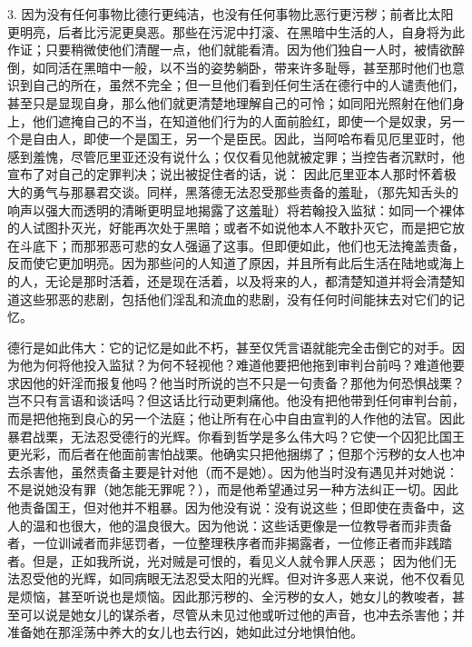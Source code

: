 3. 因为没有任何事物比德行更纯洁，也没有任何事物比恶行更污秽；前者比太阳更明亮，后者比污泥更臭恶。那些在污泥中打滚、在黑暗中生活的人，自身将为此作证；只要稍微使他们清醒一点，他们就能看清。因为他们独自一人时，被情欲醉倒，如同活在黑暗中一般，以不当的姿势躺卧，带来许多耻辱，甚至那时他们也意识到自己的所在，虽然不完全；但一旦他们看到任何生活在德行中的人谴责他们，甚至只是显现自身，那么他们就更清楚地理解自己的可怜；如同阳光照射在他们身上，他们遮掩自己的不当，在知道他们行为的人面前脸红，即使一个是奴隶，另一个是自由人，即使一个是国王，另一个是臣民。因此，当阿哈布看见厄里亚时，他感到羞愧，尽管厄里亚还没有说什么；仅仅看见他就被定罪；当控告者沉默时，他宣布了对自己的定罪判决；说出被捉住者的话，说： 因此厄里亚本人那时怀着极大的勇气与那暴君交谈。同样，黑落德无法忍受那些责备的羞耻，（那先知舌头的响声以强大而透明的清晰更明显地揭露了这羞耻）将若翰投入监狱：如同一个裸体的人试图扑灭光，好能再次处于黑暗；或者不如说他本人不敢扑灭它，而是把它放在斗底下；而那邪恶可悲的女人强逼了这事。但即便如此，他们也无法掩盖责备，反而使它更加明亮。因为那些问的人知道了原因，并且所有此后生活在陆地或海上的人，无论是那时活着，还是现在活着，以及将来的人，都清楚知道并将会清楚知道这些邪恶的悲剧，包括他们淫乱和流血的悲剧，没有任何时间能抹去对它们的记忆。\par

德行是如此伟大：它的记忆是如此不朽，甚至仅凭言语就能完全击倒它的对手。因为他为何将他投入监狱？为何不轻视他？难道他要把他拖到审判台前吗？难道他要求因他的奸淫而报复他吗？他当时所说的岂不只是一句责备？那他为何恐惧战栗？岂不只有言语和谈话吗？但这话比行动更刺痛他。他没有把他带到任何审判台前，而是把他拖到良心的另一个法庭；他让所有在心中自由宣判的人作他的法官。因此暴君战栗，无法忍受德行的光辉。你看到哲学是多么伟大吗？它使一个囚犯比国王更光彩，而后者在他面前害怕战栗。他确实只把他捆绑了；但那个污秽的女人也冲去杀害他，虽然责备主要是针对他（而不是她）。因为他当时没有遇见并对她说：不是说她没有罪（她怎能无罪呢？），而是他希望通过另一种方法纠正一切。因此他责备国王，但对他并不粗暴。因为他没有说：没有说这些；但即使在责备中，这人的温和也很大，他的温良很大。因为他说：这些话更像是一位教导者而非责备者，一位训诫者而非惩罚者，一位整理秩序者而非揭露者，一位修正者而非践踏者。但是，正如我所说，光对贼是可恨的，看见义人就令罪人厌恶； 因为他们无法忍受他的光辉，如同病眼无法忍受太阳的光辉。但对许多恶人来说，他不仅看见是烦恼，甚至听说也是烦恼。因此那污秽的、全污秽的女人，她女儿的教唆者，甚至可以说是她女儿的谋杀者，尽管从未见过他或听过他的声音，也冲去杀害他；并准备她在那淫荡中养大的女儿也去行凶，她如此过分地惧怕他。\par

